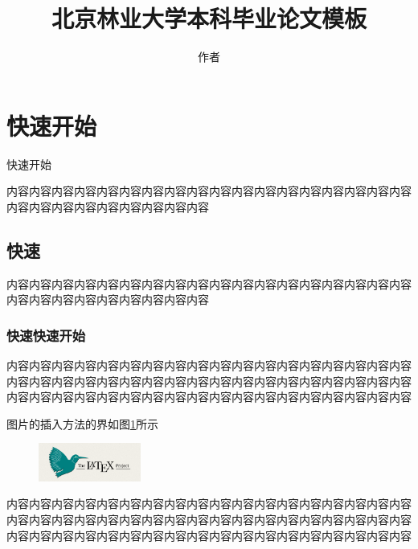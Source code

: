 \documentclass{bjfu}
\title{北京林业大学本科毕业论文模板}
\author{作者}
\begin{document}
\makeBjfuTitlePage

\section{快速开始}
快速开始 \cite{刘海洋2013LATEX}

内容内容内容内容内容内容内容内容内容内容内容内容内容内容内容内容内容内容内容内容内容内容内容内容内容内容内容

\subsection{快速}

内容内容内容内容内容内容内容内容内容内容内容内容内容内容内容内容内容内容内容内容内容内容内容内容内容内容内容

\subsubsection{快速快速开始}

内容内容内容内容内容内容内容内容内容内容内容内容内容内容内容内容内容内容内容内容内容内容内容内容内容内容内容内容内容内容内容内容内容内容内容内容内容内容内容内容内容内容内容内容内容内容内容内容内容内容内容内容内容内容

图片的插入方法的界如图\ref{Fig:test}所示
\begin{figure}[htbp] %
    \centering %
    \includegraphics[width=0.3\textwidth]{images/test.png} %
    \label{Fig:test} %
\end{figure}

内容内容内容内容内容内容内容内容内容内容内容内容内容内容内容内容内容内容内容内容内容内容内容内容内容内容内容内容内容内容内容内容内容内容内容内容内容内容内容内容内容内容内容内容内容内容内容内容内容内容内容内容内容内容
\end{document}
